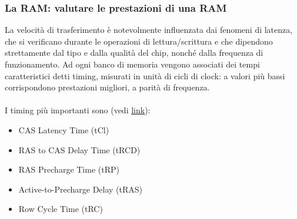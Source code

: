 \begin{frame}
	\frametitle{La RAM: valutare le prestazioni di una RAM}
	
	\begin{block}{}
		La velocità di trasferimento è notevolmente influenzata dai fenomeni di latenza, che si verificano durante le operazioni di lettura/scrittura e che dipendono strettamente dal tipo e dalla qualità del chip, nonché dalla frequenza di funzionamento. Ad ogni banco di memoria vengono associati dei tempi caratteristici detti timing, misurati in unità di cicli di clock: a valori più bassi corrispondono prestazioni migliori, a parità di frequenza.\\~\\
		
		I timing più importanti sono (vedi \underline{\href{https://it.wikipedia.org/wiki/DDR\_SDRAM}{link}}):
		\begin{itemize}
			\item CAS Latency Time (tCl)
			\item RAS to CAS Delay Time (tRCD)
			\item RAS Precharge Time (tRP)
			\item Active-to-Precharge Delay (tRAS)
			\item Row Cycle Time (tRC)
		\end{itemize}
		
	\end{block}
	
\end{frame}



